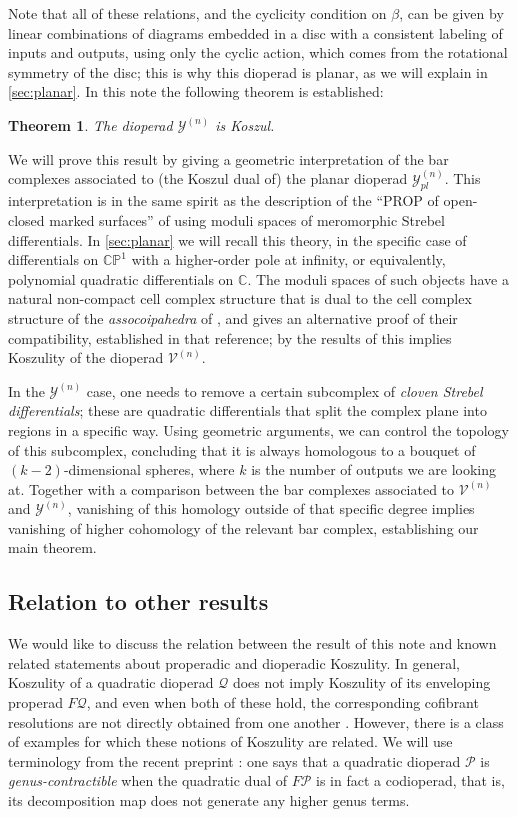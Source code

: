 \documentclass[11pt,a4paper]{amsart}
\newcommand{\CC}{\ensuremath{\mathbb{C}}}
\newcommand{\scrY}{\mathscr{Y}}
\newcommand{\scrP}{\mathscr{P}}
\newcommand{\scrQ}{\mathscr{Q}}
\newtheorem{theorem}{Theorem}
\theoremstyle{definition}
\begin{document}
Note that all of these relations, and the cyclicity condition on $\beta$, can be given by linear combinations of diagrams embedded in a disc with a consistent labeling of inputs and outputs, using only the cyclic action, which comes from the rotational symmetry of the disc; this is why this dioperad is planar, as we will explain in \cref{sec:planar}.
In this note the following theorem is established:
\begin{theorem}\label{thm:main}
    The dioperad $\mathscr{Y}^{(n)}$ is Koszul.
\end{theorem}
\noindent We will prove this result by giving a geometric interpretation of the bar complexes associated to (the Koszul dual of) the planar dioperad $\scrY^{(n)}_{pl}$. This interpretation is in the same spirit as the description of the ``PROP of open-closed marked surfaces'' of \cite{kontsevich2025pre} using moduli spaces of meromorphic Strebel differentials. In \cref{sec:planar} we will recall this theory, in the specific case of differentials on $\mathbb{CP}^1$ with a higher-order pole at infinity, or equivalently, polynomial quadratic differentials on $\CC$. The moduli spaces of such objects have a natural non-compact cell complex structure that is dual to the cell complex structure of the \emph{assocoipahedra} of \cite{poirier2018combinatorics}, and gives an alternative proof of their compatibility, established in that reference; by the results of \cite{poirier2019koszuality} this implies Koszulity of the dioperad $\mathscr{V}^{(n)}$.

In the $\mathscr{Y}^{(n)}$ case, one needs to remove a certain subcomplex of \emph{cloven Strebel differentials}; these are quadratic differentials that split the complex plane into regions in a specific way. Using geometric arguments, we can control the topology of this subcomplex, concluding that it is always homologous to a bouquet of $(k-2)$-dimensional spheres, where $k$ is the number of outputs we are looking at. Together with a comparison between the bar complexes associated to $\mathscr{V}^{(n)}$ and $\mathscr{Y}^{(n)}$, vanishing of this homology outside of that specific degree implies vanishing of higher cohomology of the relevant bar complex, establishing our main theorem.

\subsection{Relation to other results}
We would like to discuss the relation between the result of this note and known related statements about properadic and dioperadic Koszulity. In general, Koszulity of a quadratic dioperad $\scrQ$ does not imply Koszulity of its enveloping properad $F\scrQ$, and even when both of these hold, the corresponding cofibrant resolutions are not directly obtained from one another \cite{merkulov2009deformation}. However, there is a class of examples for which these notions of Koszulity are related. We will use terminology from the recent preprint \cite{khoroshkin2026properad}: one says that a quadratic dioperad $\scrP$ is \emph{genus-contractible} when the quadratic dual of $F\scrP$ is in fact a codioperad, that is, its decomposition map does not generate any higher genus terms.
\end{document}
